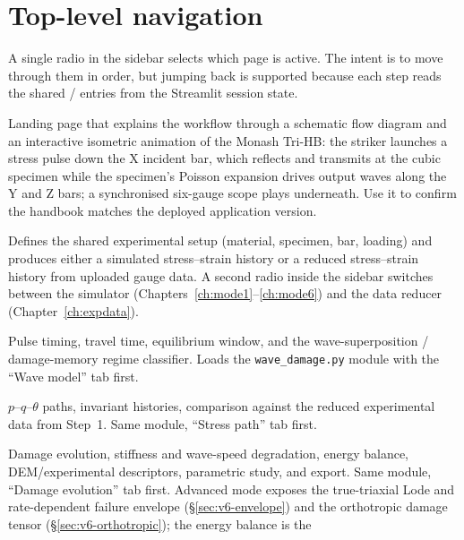 \documentclass[11pt,a4paper,openany]{book}
\theoremstyle{handbook}
\begin{document}
\section{Top-level navigation}

A single radio in the sidebar selects which page is active. The intent is
to move through them in order, but jumping back is supported because each
step reads the shared
/ entries
from the Streamlit session state.

\begin{description}[leftmargin=2em,style=nextline]
  \item[Overview] Landing page that explains the workflow through a schematic
    flow diagram and an interactive isometric animation of the Monash Tri-HB:
    the striker launches a stress pulse down the X incident bar, which reflects
    and transmits at the cubic specimen while the specimen's Poisson expansion
    drives output waves along the Y and Z bars; a synchronised six-gauge scope
    plays underneath. Use it to confirm the handbook matches the deployed
    application version.
  \item[Step 1: Setup, simulator and data]
    Defines the shared experimental setup (material, specimen, bar,
    loading) and produces either a simulated stress--strain history or a
    reduced stress--strain history from uploaded gauge data. A second
    radio inside the sidebar switches between the simulator
    (Chapters~\ref{ch:mode1}--\ref{ch:mode6}) and the data reducer
    (Chapter~\ref{ch:expdata}).
  \item[Step 2: Wave model]
    Pulse timing, travel time, equilibrium window, and the
    wave-superposition / damage-memory regime classifier. Loads the
    \texttt{wave\_damage.py} module with the ``Wave model'' tab first.
  \item[Step 3: Stress path and analysis]
    $p$--$q$--$\theta$ paths, invariant histories, comparison against the
    reduced experimental data from Step~1. Same module, ``Stress path''
    tab first.
  \item[Step 4: Damage model and DEM validation]
    Damage evolution, stiffness and wave-speed degradation, energy
    balance, DEM/experimental descriptors, parametric study, and export.
    Same module, ``Damage evolution'' tab first. Advanced mode exposes the
    true-triaxial Lode and rate-dependent failure envelope
    (\S\ref{sec:v6-envelope}) and the orthotropic damage tensor
    (\S\ref{sec:v6-orthotropic}); the energy balance is the

\end{description}
\end{document}
